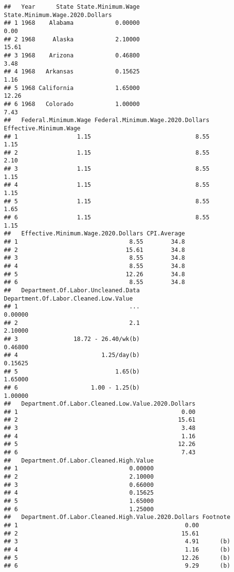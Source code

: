 \documentclass[
]{article}
\begin{document}
\begin{verbatim}
##   Year      State State.Minimum.Wage State.Minimum.Wage.2020.Dollars
## 1 1968    Alabama            0.00000                            0.00
## 2 1968     Alaska            2.10000                           15.61
## 3 1968    Arizona            0.46800                            3.48
## 4 1968   Arkansas            0.15625                            1.16
## 5 1968 California            1.65000                           12.26
## 6 1968   Colorado            1.00000                            7.43
##   Federal.Minimum.Wage Federal.Minimum.Wage.2020.Dollars Effective.Minimum.Wage
## 1                 1.15                              8.55                   1.15
## 2                 1.15                              8.55                   2.10
## 3                 1.15                              8.55                   1.15
## 4                 1.15                              8.55                   1.15
## 5                 1.15                              8.55                   1.65
## 6                 1.15                              8.55                   1.15
##   Effective.Minimum.Wage.2020.Dollars CPI.Average
## 1                                8.55        34.8
## 2                               15.61        34.8
## 3                                8.55        34.8
## 4                                8.55        34.8
## 5                               12.26        34.8
## 6                                8.55        34.8
##   Department.Of.Labor.Uncleaned.Data Department.Of.Labor.Cleaned.Low.Value
## 1                                ...                               0.00000
## 2                                2.1                               2.10000
## 3                18.72 - 26.40/wk(b)                               0.46800
## 4                        1.25/day(b)                               0.15625
## 5                            1.65(b)                               1.65000
## 6                     1.00 - 1.25(b)                               1.00000
##   Department.Of.Labor.Cleaned.Low.Value.2020.Dollars
## 1                                               0.00
## 2                                              15.61
## 3                                               3.48
## 4                                               1.16
## 5                                              12.26
## 6                                               7.43
##   Department.Of.Labor.Cleaned.High.Value
## 1                                0.00000
## 2                                2.10000
## 3                                0.66000
## 4                                0.15625
## 5                                1.65000
## 6                                1.25000
##   Department.Of.Labor.Cleaned.High.Value.2020.Dollars Footnote
## 1                                                0.00         
## 2                                               15.61         
## 3                                                4.91      (b)
## 4                                                1.16      (b)
## 5                                               12.26      (b)
## 6                                                9.29      (b)
\end{verbatim}
\end{document}
